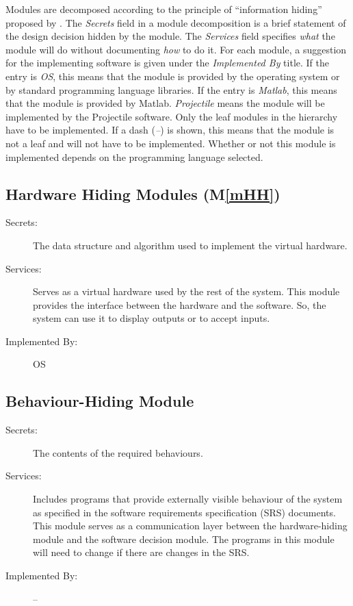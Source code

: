 \documentclass[12pt]{article}
\newcommand{\mref}[1]{M\ref{#1}}
\begin{document}
Modules are decomposed according to the principle of ``information hiding''
proposed by \citet{ParnasEtAl1984}. The \emph{Secrets} field in a module
decomposition is a brief statement of the design decision hidden by the
module. The \emph{Services} field specifies \emph{what} the module will do
without documenting \emph{how} to do it. For each module, a suggestion for the
implementing software is given under the \emph{Implemented By} title. If the
entry is \emph{OS}, this means that the module is provided by the operating
system or by standard programming language libraries. If the entry is
\emph{Matlab}, this means that the module is provided by Matlab.  
\emph{Projectile} means the module will be implemented by the Projectile 
software. Only the leaf modules in the hierarchy have to be implemented. If a 
dash (\emph{--}) is shown, this means that the module is not a leaf and will not 
have to be implemented. Whether or not this module is implemented depends on the 
programming language selected.

\subsection{Hardware Hiding Modules (\mref{mHH})}

\begin{description}
\item[Secrets:] The data structure and algorithm used to implement the virtual
  hardware.
\item[Services:] Serves as a virtual hardware used by the rest of the
  system. This module provides the interface between the hardware and the
  software. So, the system can use it to display outputs or to accept inputs.
\item[Implemented By:] OS
\end{description}

\subsection{Behaviour-Hiding Module}

\begin{description}
\item[Secrets:] The contents of the required behaviours.
\item[Services:] Includes programs that provide externally visible behaviour of
  the system as specified in the software requirements specification (SRS)
  documents. This module serves as a communication layer between the
  hardware-hiding module and the software decision module. The programs in this
  module will need to change if there are changes in the SRS.
\item[Implemented By:] --
\end{description}
\end{document}
